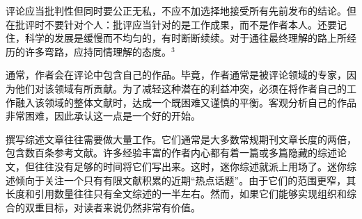 评论应当批判性但同时要公正无私，不应不加选择地接受所有先前发布的结论。但在批评时不要针对个人：批评应当针对的是工作成果，而不是作者本人。还要记住，科学的发展是缓慢而不均匀的，有时断断续续。对于通往最终理解的路上所经历的许多弯路，应持同情理解的态度。${ }^{3}$

通常，作者会在评论中包含自己的作品。毕竟，作者通常是被评论领域的专家，因为他们对该领域有所贡献。为了减轻这种潜在的利益冲突，必须在将作者自己的工作融入该领域的整体文献时，达成一个既困难又谨慎的平衡。客观分析自己的作品非常困难，因此承认这一点是一个好的开始。

撰写综述文章往往需要做大量工作。它们通常是大多数常规期刊文章长度的两倍，包含数百条参考文献。许多经验丰富的作者内心都有着一篇或多篇隐藏的综述论文，但往往没有足够的时间将它们写出来。这时，迷你综述就派上用场了。迷你综述倾向于关注一个只有有限文献积累的近期“热点话题”。由于它们的范围更窄，其长度和引用数量往往只有全文综述的一半左右。然而，如果它们能够实现组织和综合的双重目标，对读者来说仍然非常有价值。

